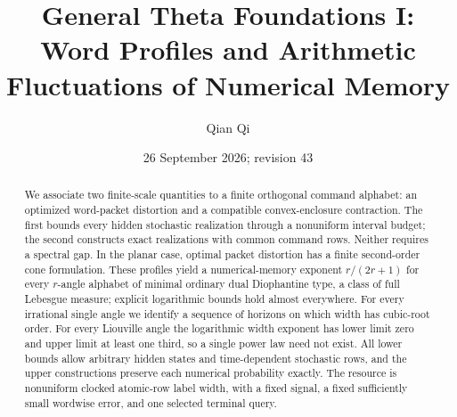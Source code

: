 \documentclass[11pt]{amsart}
\title[Word profiles and numerical memory]{General Theta Foundations I: Word Profiles and Arithmetic Fluctuations of Numerical Memory}
\author{Qian Qi}
\date{26 September 2026; revision 43}
\numberwithin{equation}{section}
\theoremstyle{definition}\newtheorem{definition}[theorem]{Definition}
\begin{document}
\begin{abstract}
We associate two finite-scale quantities to a finite orthogonal command alphabet: an optimized word-packet distortion and a compatible convex-enclosure contraction. The first bounds every hidden stochastic realization through a nonuniform interval budget; the second constructs exact realizations with common command rows. Neither requires a spectral gap. In the planar case, optimal packet distortion has a finite second-order cone formulation. These profiles yield a numerical-memory exponent $r/(2r+1)$ for every $r$-angle alphabet of minimal ordinary dual Diophantine type, a class of full Lebesgue measure; explicit logarithmic bounds hold almost everywhere. For every irrational single angle we identify a sequence of horizons on which width has cubic-root order. For every Liouville angle the logarithmic width exponent has lower limit zero and upper limit at least one third, so a single power law need not exist. All lower bounds allow arbitrary hidden states and time-dependent stochastic rows, and the upper constructions preserve each numerical probability exactly. The resource is nonuniform clocked atomic-row label width, with a fixed signal, a fixed sufficiently small wordwise error, and one selected terminal query.
\end{abstract}
\maketitle









\end{document}
